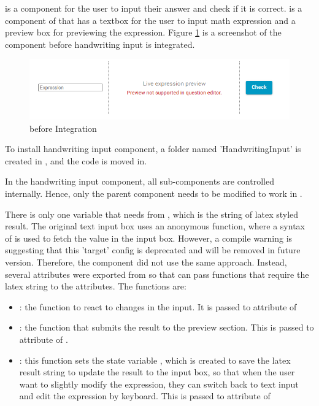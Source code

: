 \documentclass[12pt,twoside]{report}
\begin{document}
 is a component for the user to input their answer and check
if it is correct.  is a component of 
that has a textbox for the user to input math expression and a preview box for
previewing the expression. Figure \ref{fig:expressioninput-before} is a screenshot of the component  before handwriting input is integrated.
\begin{figure}
    \centering
    \includegraphics[width=0.9\linewidth, frame]{figures/expressioninput-before.png}
    \caption{ before Integration}
    \label{fig:expressioninput-before}
\end{figure}

To install handwriting input component, a folder named 'HandwritingInput' is created in , and the code is moved in.

In the handwriting input component, all sub-components are controlled
internally. Hence, only the parent component  needs to be
modified to work in .

There is only one variable that  needs from
, which is the string of latex styled result. The
original text input box uses an anonymous function, where a syntax of
 is used to fetch the value in the input box. However, a
compile warning is suggesting that this 'target' config is deprecated and will
be removed in future version. Therefore, the  component
did not use the same approach. Instead, several attributes were exported from
 so that  can pass functions that
require the latex string to the attributes. The functions are:
\begin{itemize}
    \item {}: the function to react to changes in the input. It is passed to attribute  of 
    \item {}: the function that submits the result to the preview section. This is passed to attribute  of .
    \item {}: this function sets the state variable
    , which is created to save the latex result string to
    update the result to the input box, so that when the user want to slightly
    modify the expression, they can switch back to text input and edit the
    expression by keyboard. This is passed to attribute  of
\end{itemize}
\end{document}
